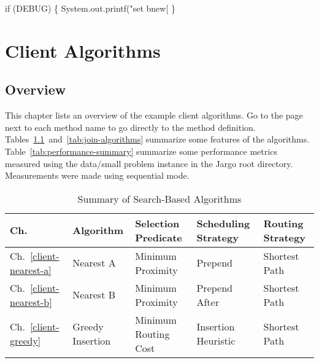 \nwenddocs{}\endmoddef\nwstartdeflinemarkup{}\nwenddeflinemarkup
if (DEBUG) \{
  System.out.printf("set bnew[%
\}
\nwendcode{}\nwdocspar

\nwenddocs{}\part{Client Algorithms}
\label{part-client}

\chapter{Overview}
\label{client-overview}

This chapter lists an overview of the example client algorithms. Go to the page
next to each method name to go directly to the method definition.
Tables~\ref{tab:search-algorithms}~and~\ref{tab:join-algorithms} summarize some
features of the algorithms. Table~\ref{tab:performance-summary} summarize some
performance metrics measured using the {\Tt{}data/small\nwendquote} problem instance in the
Jargo root directory. Measurements were made using sequential mode.

\begin{table}[h]
\begin{center}
\caption{Summary of Search-Based Algorithms}
\label{tab:search-algorithms}
\begin{tabular}{|l|l|l|l|l|}
\hline
Ch. & Algorithm & Selection Predicate & Scheduling Strategy & Routing Strategy \\
\hline
Ch.~\ref{client-nearest-a} & Nearest A & Minimum Proximity & Prepend & Shortest Path \\
Ch.~\ref{client-nearest-b} & Nearest B & Minimum Proximity & Prepend After& Shortest Path \\
Ch.~\ref{client-greedy} & Greedy Insertion & Minimum Routing Cost & Insertion Heuristic & Shortest Path \\
\hline
\end{tabular}
\end{center}
\end{table}

